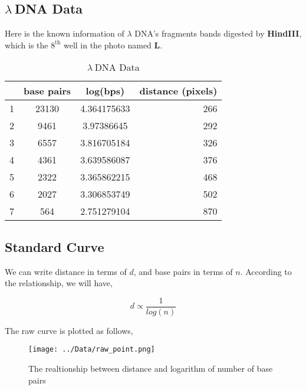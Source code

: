 \documentclass{article}
\begin{document}
        \subsection{\boldmath$\lambda\ $\unboldmath DNA Data}
            Here is the known information of $\lambda$ DNA's fragments bands digested by \textbf{HindIII}, which is the $8^{\text{th}}$ well in the photo named {\bf{L}}.

            \begin{table}[H]
                \caption{$\lambda\ $DNA Data}
                \centering
                \begin{tabular}{|l|c|c|r|}
                    \hline
                    &base pairs&log(bps)&distance (pixels)\\
                    \hline
                    1&      23130&4.364175633&266\\
                    2&      9461&3.97386645&292\\
                    3&      6557&3.816705184&326\\
                    4&      4361&3.639586087&376\\
                    5&      2322&3.365862215&468\\
                    6&      2027&3.306853749&502\\
                    7&      564&2.751279104&870\\
                    \hline
                \end{tabular}
                \label{l.data}
            \end{table}

        \subsection{Standard Curve}

            We can write distance in terms of $d$, and base pairs in terms of $n$. According to the relationship, we will have,

            $$d \propto \frac{1}{log(n)}$$

            The raw curve is plotted as follows,
            \begin{figure}[H]
                \centering
                \texttt{[image: ../Data/raw\_point.png]}
                \caption{The realtionship between distance and logarithm of number of base pairs}
                \label{raw.curve}
            \end{figure}
\end{document}
